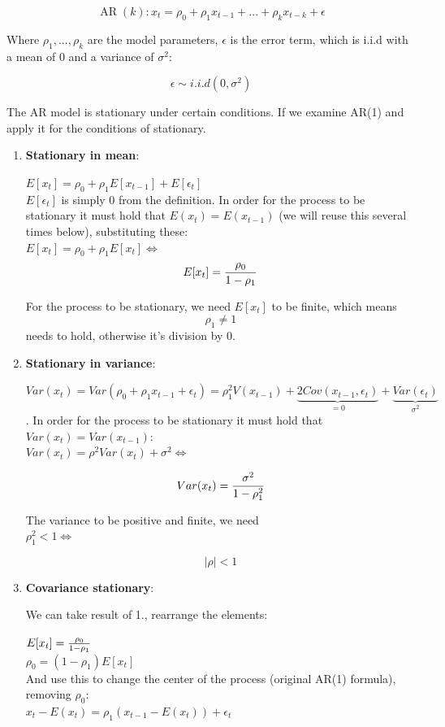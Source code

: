 \[\operatorname{AR}(k): x_t = \rho_0 + \rho_1 x_{t-1} + ... + \rho_k x_{t-k} + \epsilon\]

Where \(\rho_1, ..., \rho_k\) are the model parameters, \(\epsilon\) is the error term, which is i.i.d with a mean of \(0\) and a variance of \(\sigma^2\):

\[\epsilon \sim i.i.d(0, \sigma^2)\]

The AR model is stationary under certain conditions. If we examine AR(1) and apply it for the conditions of stationary.

\begin{enumerate}
    \item \textbf{Stationary in mean}:

\(E[x_t] = \rho_0 + \rho_1 E[x_{t-1}] + E[\epsilon_t]\) \\
\(E[\epsilon_t]\) is simply 0 from the definition. In order for the process to be stationary it must hold that \(E(x_t) = E(x_{t-1})\)  (we will reuse this several times below), substituting these: \\
\(E[x_t] = \rho_0 + \rho_1 E[x_t] \Leftrightarrow\) \\
\[E[x_t] = {\rho_0 \over 1 - \rho_1}\]

For the process to be stationary, we need \(E[x_t]\) to be finite, which means \[\rho_1 \neq 1\] needs to hold, otherwise it's division by 0.

    \item \textbf{Stationary in variance}:

\(Var(x_t)=Var(\rho_0+\rho_1x_{t-1}+\epsilon_t)=\rho_1^2V(x_{t-1})+\underbrace{2Cov(x_{t-1},\epsilon_t)}_{=0}+\underbrace{Var(\epsilon_t)}_{\sigma^2}\). In order for the process to be stationary it must hold that \(Var(x_t) = Var(x_{t-1})\): \\
\(Var(x_t)=\rho^2Var(x_t)+\sigma^2 \Leftrightarrow\)

\[Var(x_t)={\sigma^2 \over 1-\rho_1^2}\]

The variance to be positive and finite, we need \\
\(\rho_1^2<1 \Leftrightarrow\)

\[\vert \rho \vert <1\]

    \item \textbf{Covariance stationary}:

We can take result of 1., rearrange the elements:

\(E[x_t] = {\rho_0 \over 1 - \rho_1}\) \\
\(\rho_0 = (1 - \rho_1)E[x_t]\) \\
And use this to change the center of the process (original AR(1) formula), removing \(\rho_0\):\\
\(x_t-E(x_t)=\rho_1(x_{t-1}-E(x_t))+\epsilon_t\)


\end{enumerate}
